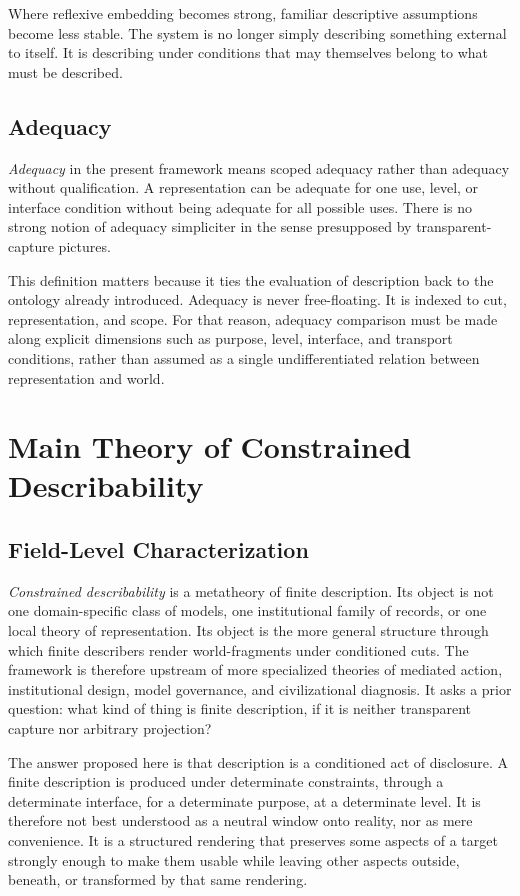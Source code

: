 \documentclass[11pt]{article}
\renewcommand{\emph}[1]{\textit{#1}}
\begin{document}
Where reflexive embedding becomes strong, familiar descriptive assumptions become less stable. The system is no longer simply describing something external to itself. It is describing under conditions that may themselves belong to what must be described. \cite{bolander_self_reference_sep}

\subsection{Adequacy}

\emph{Adequacy} in the present framework means scoped adequacy rather than adequacy without qualification. A representation can be adequate for one use, level, or interface condition without being adequate for all possible uses. There is no strong notion of adequacy simpliciter in the sense presupposed by transparent-capture pictures.

This definition matters because it ties the evaluation of description back to the ontology already introduced. Adequacy is never free-floating. It is indexed to cut, representation, and scope. For that reason, adequacy comparison must be made along explicit dimensions such as purpose, level, interface, and transport conditions, rather than assumed as a single undifferentiated relation between representation and world. \cite{frigg_nguyen_scientific_representation_sep,scientific_pluralism_sep}
\section{Main Theory of Constrained Describability}

\subsection{Field-Level Characterization}

\emph{Constrained describability} is a metatheory of finite description. Its object is not one domain-specific class of models, one institutional family of records, or one local theory of representation. Its object is the more general structure through which finite describers render world-fragments under conditioned cuts. The framework is therefore upstream of more specialized theories of mediated action, institutional design, model governance, and civilizational diagnosis. It asks a prior question: what kind of thing is finite description, if it is neither transparent capture nor arbitrary projection?

The answer proposed here is that description is a conditioned act of disclosure. A finite description is produced under determinate constraints, through a determinate interface, for a determinate purpose, at a determinate level. It is therefore not best understood as a neutral window onto reality, nor as mere convenience. It is a structured rendering that preserves some aspects of a target strongly enough to make them usable while leaving other aspects outside, beneath, or transformed by that same rendering. \cite{frigg_hartmann_models_sep,frigg_nguyen_scientific_representation_sep}
\end{document}
